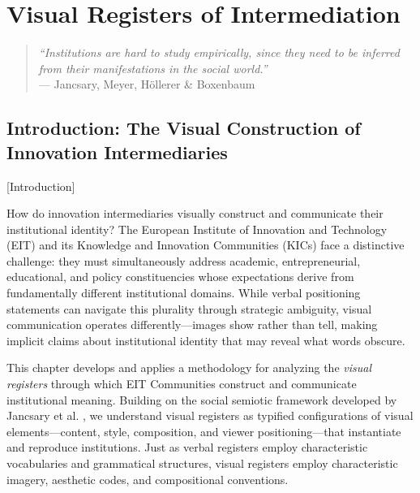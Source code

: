 \documentclass[../main.tex]{subfiles}
\begin{document}
\chapter{Visual Registers of Intermediation}
\margintoc

\begin{quote}
\textit{``Institutions are hard to study empirically, since they need to be inferred from their manifestations in the social world.''}\\
--- Jancsary, Meyer, Höllerer \& Boxenbaum \cite{jancsary2018institutions}
\end{quote}

\section{Introduction: The Visual Construction of Innovation Intermediaries}[Introduction]

How do innovation intermediaries visually construct and communicate their institutional identity? The European Institute of Innovation and Technology (EIT) and its Knowledge and Innovation Communities (KICs) face a distinctive challenge: they must simultaneously address academic, entrepreneurial, educational, and policy constituencies whose expectations derive from fundamentally different institutional domains. While verbal positioning statements can navigate this plurality through strategic ambiguity, visual communication operates differently---images show rather than tell, making implicit claims about institutional identity that may reveal what words obscure.

This chapter develops and applies a methodology for analyzing the \textit{visual registers} through which EIT Communities construct and communicate institutional meaning. Building on the social semiotic framework developed by Jancsary et al. \cite{jancsary2018institutions}, we understand visual registers as typified configurations of visual elements---content, style, composition, and viewer positioning---that instantiate and reproduce institutions. Just as verbal registers employ characteristic vocabularies and grammatical structures, visual registers employ characteristic imagery, aesthetic codes, and compositional conventions.
\end{document}
